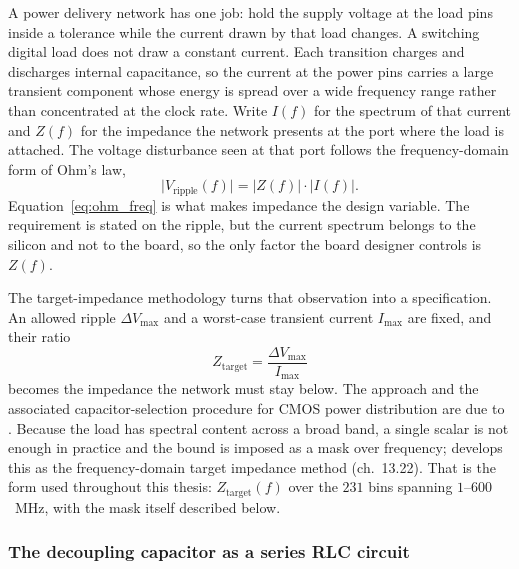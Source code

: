 A power delivery network has one job: hold the supply voltage at the load pins
inside a tolerance while the current drawn by that load changes. A switching
digital load does not draw a constant current. Each transition charges and
discharges internal capacitance, so the current at the power pins carries a large
transient component whose energy is spread over a wide frequency range rather
than concentrated at the clock rate. Write $I(f)$ for the spectrum of that
current and $Z(f)$ for the impedance the network presents at the port where the
load is attached. The voltage disturbance seen at that port follows the
frequency-domain form of Ohm's law,
\begin{equation}
\lvert V_{\mathrm{ripple}}(f) \rvert = \lvert Z(f) \rvert \cdot \lvert I(f) \rvert .
\label{eq:ohm_freq}
\end{equation}
Equation~\ref{eq:ohm_freq} is what makes impedance the design variable. The
requirement is stated on the ripple, but the current spectrum belongs to the
silicon and not to the board, so the only factor the board designer controls is
$Z(f)$.

The target-impedance methodology turns that observation into a specification.
An allowed ripple $\Delta V_{\max}$ and a worst-case transient current
$I_{\max}$ are fixed, and their ratio
\begin{equation}
Z_{\mathrm{target}} = \frac{\Delta V_{\max}}{I_{\max}}
\label{eq:target_impedance}
\end{equation}
becomes the impedance the network must stay below. The approach and the
associated capacitor-selection procedure for CMOS power distribution are due to
\cite{smith1999target}. Because the load has spectral content across a broad
band, a single scalar is not enough in practice and the bound is imposed as a
mask over frequency; \cite{bogatin2018signal} develops this as the
frequency-domain target impedance method (ch.~13.22). That is the form used
throughout this thesis: $Z_{\mathrm{target}}(f)$ over the $231$ bins spanning
$1$--$600$~MHz, with the mask itself described below.

\subsubsection*{The decoupling capacitor as a series RLC circuit}

